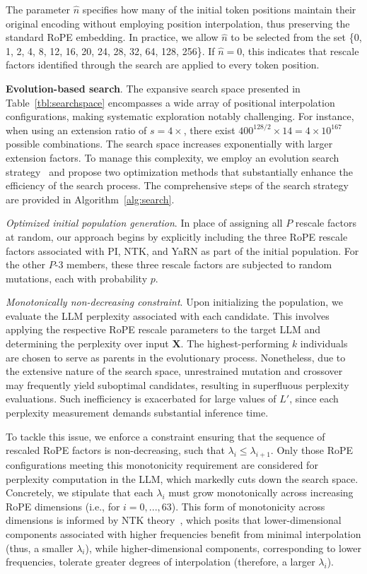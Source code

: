 The parameter $\hat{n}$ specifies how many of the initial token positions maintain their original encoding without employing position interpolation, thus preserving the standard RoPE embedding. In practice, we allow $\hat{n}$ to be selected from the set \{0, 1, 2, 4, 8, 12, 16, 20, 24, 28, 32, 64, 128, 256\}. If $\hat{n}=0$, this indicates that rescale factors identified through the search are applied to every token position.

\textbf{Evolution-based search}. The expansive search space presented in Table~\ref{tbl:searchspace} encompasses a wide array of positional interpolation configurations, making systematic exploration notably challenging. For instance, when using an extension ratio of $s=4\times$, there exist $400^{128/2}\times14=4\times10^{167}$ possible combinations. The search space increases exponentially with larger extension factors. To manage this complexity, we employ an evolution search strategy~\cite{guo2020single} and propose two optimization methods that substantially enhance the efficiency of the search process. The comprehensive steps of the search strategy are provided in Algorithm~\ref{alg:search}.

\textit{Optimized initial population generation}. In place of assigning all $P$ rescale factors at random, our approach begins by explicitly including the three RoPE rescale factors associated with PI, NTK, and YaRN as part of the initial population. For the other $P$-3 members, these three rescale factors are subjected to random mutations, each with probability $p$.

\textit{Monotonically non-decreasing constraint}. Upon initializing the population, we evaluate the LLM perplexity associated with each candidate. This involves applying the respective RoPE rescale parameters to the target LLM and determining the perplexity over input $\mathbf{X}$. The highest-performing $k$ individuals are chosen to serve as parents in the evolutionary process. Nonetheless, due to the extensive nature of the search space, unrestrained mutation and crossover may frequently yield suboptimal candidates, resulting in superfluous perplexity evaluations. Such inefficiency is exacerbated for large values of $L'$, since each perplexity measurement demands substantial inference time.

To tackle this issue, we enforce a constraint ensuring that the sequence of rescaled RoPE factors is non-decreasing, such that $\lambda_i \leq \lambda_{i+1}$. Only those RoPE configurations meeting this monotonicity requirement are considered for perplexity computation in the LLM, which markedly cuts down the search space. Concretely, we stipulate that each $\lambda_i$ must grow monotonically across increasing RoPE dimensions (i.e., for $i=0,...,63$). This form of monotonicity across dimensions is informed by NTK theory~\cite{jacot2018neural,tancik2020fourier,ntk}, which posits that lower-dimensional components associated with higher frequencies benefit from minimal interpolation (thus, a smaller $\lambda_i$), while higher-dimensional components, corresponding to lower frequencies, tolerate greater degrees of interpolation (therefore, a larger $\lambda_i$).

